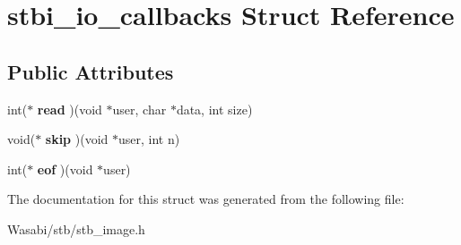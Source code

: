 \hypertarget{structstbi__io__callbacks}{}\section{stbi\+\_\+io\+\_\+callbacks Struct Reference}
\label{structstbi__io__callbacks}
\subsection*{Public Attributes}
\begin{DoxyCompactItemize}
\item 
int($\ast$ {\bfseries read} )(void $\ast$user, char $\ast$data, int size)\hypertarget{structstbi__io__callbacks_a623e46b3a2a019611601409926283a88}{}\label{structstbi__io__callbacks_a623e46b3a2a019611601409926283a88}

\item 
void($\ast$ {\bfseries skip} )(void $\ast$user, int n)\hypertarget{structstbi__io__callbacks_a257aac5480a90a6c4b8fbe86c1b01068}{}\label{structstbi__io__callbacks_a257aac5480a90a6c4b8fbe86c1b01068}

\item 
int($\ast$ {\bfseries eof} )(void $\ast$user)\hypertarget{structstbi__io__callbacks_a319639db2f76e715eed7a7a974136832}{}\label{structstbi__io__callbacks_a319639db2f76e715eed7a7a974136832}

\end{DoxyCompactItemize}


The documentation for this struct was generated from the following file\+:\begin{DoxyCompactItemize}
\item 
Wasabi/stb/stb\+\_\+image.\+h\end{DoxyCompactItemize}
